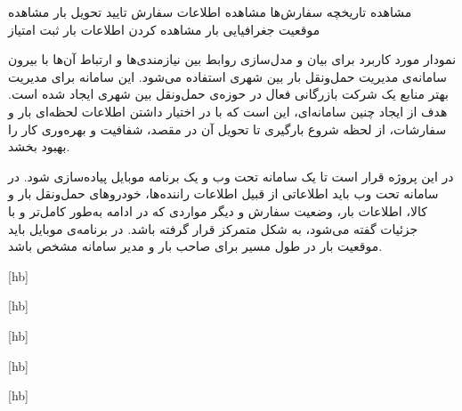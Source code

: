 	 
		 مشاهده تاریخچه سفارش‌ها
		 مشاهده اطلاعات سفارش
		 تایید تحویل بار
		 مشاهده موقعیت جغرافیایی بار
		 مشاهده کردن اطلاعات بار
		 ثبت امتیاز

\newpage


نمودار مورد کاربرد برای بیان و مدل‌سازی روابط بین نیازمندی‌ها و ارتباط آن‌ها با بیرون سامانه‌ی مدیریت حمل‌ونقل بار بین شهری استفاده می‌شود. این سامانه برای مدیریت بهتر منابع یک شرکت بازرگانی فعال در حوزه‌ی حمل‌ونقل بین شهری ایجاد شده است. هدف از ایجاد چنین سامانه‌ای، این است که با در اختیار داشتن اطلاعات لحظه‌ای بار و سفارشات، از لحظه شروع بارگیری تا تحویل آن در مقصد، شفافیت و بهره‌وری کار را بهبود بخشد. 

در این پروژه قرار است تا یک سامانه تحت وب و یک برنامه موبایل پیاده‌سازی شود. در سامانه تحت وب باید اطلاعاتی از قبیل اطلاعات راننده‌ها، خودروهای حمل‌ونقل بار و کالا، اطلاعات بار، وضعیت سفارش و دیگر مواردی که در ادامه  به‌طور کامل‌تر و با جزئیات گفته می‌شود، به شکل متمرکز قرار گرفته باشد. در برنامه‌ی موبایل باید موقعیت بار در طول مسیر برای صاحب بار و مدیر سامانه مشخص باشد.

\newpage
{}

[hb]

\newpage


[hb]

\newpage
{}

[hb]
\newpage
{}

[hb]
\newpage
{}

[hb]

